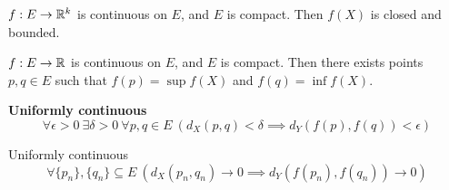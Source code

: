     \begin{theo}
        $f: E \to \mathbb{R}^k$ is continuous on $E$, and $E$ is compact. Then $f(X)$ is closed and bounded.
    \end{theo}

    \begin{theo}
        $f: E \to \mathbb{R}$ is continuous on $E$, and $E$ is compact. Then there exists points $p, q \in E$ such that $f(p) = \sup f(X)$ and $f(q) = \inf f(X)$.
    \end{theo}

    \begin{defi}
        \textbf{Uniformly continuous}
        \begin{equation}
            \forall \epsilon > 0 \ \exists \delta > 0 \ \forall p,q \in E \ \left(d_X(p,q) < \delta \implies d_Y(f(p),f(q)) < \epsilon \right)
        \end{equation}
    \end{defi}
    \begin{theo}
        Uniformly continuous
        \begin{equation}
            \forall \{p_n\}, \{q_n\} \subseteq E \ \left(d_X(p_n, q_n) \to 0 \implies d_Y(f(p_n), f(q_n)) \to 0 \right)
        \end{equation}
    \end{theo}
